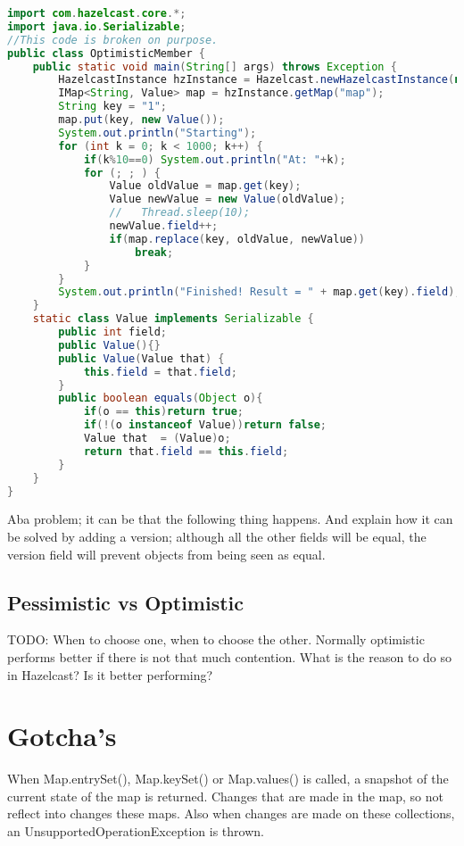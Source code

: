 \begin{lstlisting}[language=java]
import com.hazelcast.core.*;
import java.io.Serializable;
//This code is broken on purpose.
public class OptimisticMember {
    public static void main(String[] args) throws Exception {
        HazelcastInstance hzInstance = Hazelcast.newHazelcastInstance(null);
        IMap<String, Value> map = hzInstance.getMap("map");
        String key = "1";
        map.put(key, new Value());
        System.out.println("Starting");
        for (int k = 0; k < 1000; k++) {
            if(k%10==0) System.out.println("At: "+k);
            for (; ; ) {
                Value oldValue = map.get(key);
                Value newValue = new Value(oldValue);
                //   Thread.sleep(10);
                newValue.field++;
                if(map.replace(key, oldValue, newValue))
                    break;
            }
        }
        System.out.println("Finished! Result = " + map.get(key).field);
    }
    static class Value implements Serializable {
        public int field;
        public Value(){}
        public Value(Value that) {
            this.field = that.field;
        }
        public boolean equals(Object o){
            if(o == this)return true;
            if(!(o instanceof Value))return false;
            Value that  = (Value)o;
            return that.field == this.field;
        }
    }
}
\end{lstlisting}
Aba problem; it can be that the following thing happens. And explain how it can be solved by adding a version; although all the other fields will be equal, the version field will prevent objects from being seen as equal.

\subsection{Pessimistic vs Optimistic}
TODO: When to choose one, when to choose the other. Normally optimistic performs better if there is not that much contention. What is the reason to do so in Hazelcast? Is it better performing?


\section{Gotcha's}
When Map.entrySet(), Map.keySet() or Map.values() is called, a snapshot of the current state of the map is returned. Changes that are made in the map, so not reflect into changes these maps. Also when changes are made on these collections, an UnsupportedOperationException is thrown.

